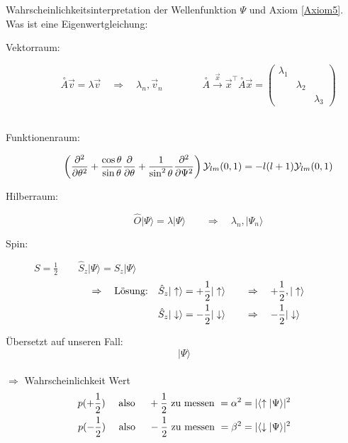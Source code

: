 Wahrscheinlichkeitsinterpretation der Wellenfunktion $ \Psi $ und Axiom \ref{Axiom5}.\\[5pt]
Was ist eine Eigenwertgleichung:\\
\begin{description}
	\item[Vektorraum:]
	$$ \overset{\circ}{A} \vec{v} = \lambda \vec{v} \quad \Rightarrow \quad \lambda_n, \vec{v}_n \qquad \qquad \overset{\circ}{A} \overset{\vec{x}}{\rightarrow} \vec{x}^\top \overset{\circ}{A} \vec{x} = \begin{pmatrix}
	\lambda_1 \\
	& \lambda_2 \\
	& & \lambda_3
	\end{pmatrix} $$
	\\[5pt]
	\item[Funktionenraum:]
	$$ \left(\frac{\partial ^2}{\partial \theta^2} + \frac{\cos \theta}{\sin \theta} \frac{\partial }{\partial \theta} + \frac{1}{\sin ^2 \theta} \frac{\partial ^2}{\partial \Psi^2} \right) \mathcal{Y}_{lm}(0,1) = - l ( l + 1 ) \mathcal{Y}_{lm}(0,1) $$
	\item[Hilberraum:]
	$$ \hat{O} | \Psi \rangle = \lambda | \Psi \rangle \qquad \Rightarrow \quad \lambda_n, | \Psi_n \rangle $$
	\item[Spin:] $ S = \frac{1}{2} \qquad \hat{S}_z |\Psi \rangle = S_z |\Psi \rangle $
	\begin{align*}
	\Rightarrow \quad \textrm{Lösung:} \quad \hat{S}_z |\uparrow \rangle &= + \frac{1}{2} | \uparrow \rangle \qquad \Rightarrow \quad + \frac{1}{2}, | \uparrow \rangle\\
	\hat{S}_z | \downarrow \rangle &= - \frac{1}{2} | \downarrow \rangle \qquad \Rightarrow \quad - \frac{1}{2} | \downarrow \rangle
	\end{align*}
\end{description}
Übersetzt auf unseren Fall:
\begin{equation*}
| \Psi \rangle
\end{equation*}
%
%
%
\hfw\\
%
%
%
$ \Rightarrow $ Wahrscheinlichkeit Wert
\begin{align*}
p(+\frac{1}{2}) \quad \textrm{ also } \quad + \frac{1}{2} \textrm{ zu messen } = \alpha^2 = | \langle \uparrow | \Psi \rangle | ^2\\
p(-\frac{1}{2}) \quad \textrm{ also } \quad - \frac{1}{2} \textrm{ zu messen } = \beta^2 = |\langle \downarrow | \Psi \rangle | ^2
\end{align*}

